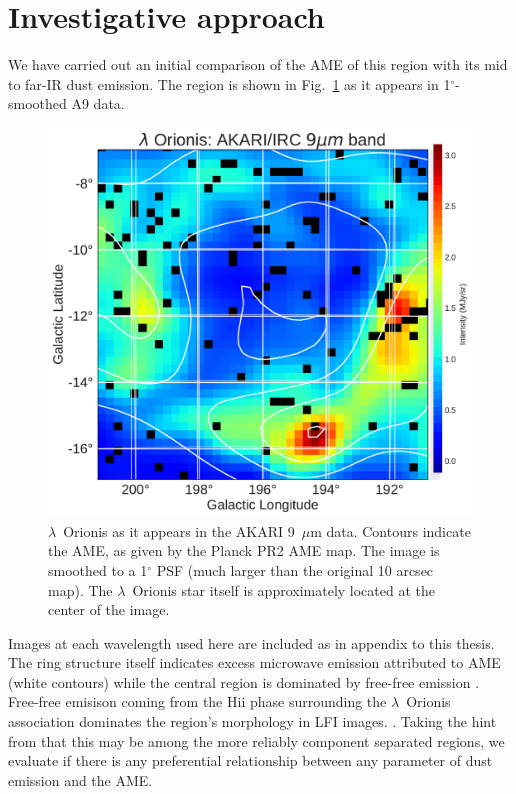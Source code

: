 \section{Investigative approach}
  We have carried out an initial comparison of the AME of this region with its mid to far-IR dust emission. The region is shown in Fig.~\ref{fig:orionis-akari9} as it appears in 1$^{\circ}$-smoothed A9 data.
      \begin{figure}
        \includegraphics[width=\textwidth]{../Plots/LOri_akari9_AMEcont_1dres.pdf}
        \centering
        \caption{$\lambda$~Orionis as it appears in the AKARI 9~$\mu$m data. Contours indicate the AME, as given by the Planck PR2 AME map. The image is smoothed to a 1$^{\circ}$ PSF (much larger than the original 10 arcsec map). The $\lambda$~Orionis star itself is approximately located at the center of the image.}
        \label{fig:orionis-akari9}
      \end{figure}
      Images at each wavelength used here are included as in appendix to this thesis.
   The ring structure itself indicates excess microwave emission attributed to AME (white contours) while the central region is dominated by free-free emission \citep{aran09, koenig15}. Free-free emisison coming from the Hii phase surrounding the $\lambda$~Orionis association dominates the region's morphology in LFI images. \citep{planck15XXV}. Taking the hint from \cite{planck15XXV} that this may be among the more reliably component separated regions, we evaluate if there is any preferential relationship between any parameter of dust emission and the AME.

